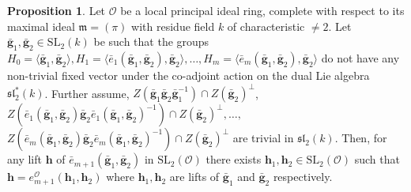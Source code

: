 \documentclass[10pt,twoside]{amsart}
\newcommand{\SL}{\mathrm{SL}}
\theoremstyle{definition}
\theoremstyle{definition}
\newtheorem{proposition}[theorem]{Proposition}
\begin{document}
\begin{proposition}{\label{adelic 2}}
Let $\mathcal{O}$ be a local principal ideal ring, complete with respect to its maximal ideal $\mathfrak{m}=(\pi)$ with residue field $k$ of characteristic $\neq 2$. Let $\mathbf{\bar g}_1, \mathbf{\bar g}_2 \in \SL_2(k)$ be such that the groups $H_0=\langle \mathbf{\bar g}_1,\mathbf{\bar g}_2\rangle, H_1=\langle \bar e_1(\mathbf{\bar g}_1,\mathbf{\bar g}_2),\mathbf{\bar g}_2\rangle, \ldots, H_m = \langle \bar e_m(\mathbf{\bar g}_1,\mathbf{\bar g}_2), \mathbf{\bar g}_2\rangle$ do not have any non-trivial fixed vector under the co-adjoint action on the dual Lie algebra $\mathfrak{sl}_2^*(k)$. Further assume, $Z\left(\mathbf{\bar g}_1\mathbf{\bar g}_2\mathbf{\bar g}_1^{-1}\right)\cap Z\left(\mathbf{\bar g}_2\right)^{\perp}$,   $Z\left(\bar e_1(\mathbf{\bar g}_1, \mathbf{\bar g}_2) \mathbf{\bar g}_2\bar e_1(\mathbf{\bar g}_1, \mathbf{\bar g}_2)^{-1}\right) \cap Z\left(\mathbf{\bar g}_2\right)^{\perp}, \ldots,$ $Z\left(\bar e_{m}(\mathbf{\bar g}_1, \mathbf{\bar g}_2)\mathbf{\bar g}_2\bar e_{m}(\mathbf{\bar g}_1, \mathbf{\bar g}_2)^{-1}\right)\cap Z\left(\mathbf{\bar g}_2\right)^{\perp}$ are trivial in $\mathfrak{sl}_2(k)$. Then, for any lift $\mathbf{h}$ of $\bar e_{m+1}(\mathbf{\bar g}_1, \mathbf{\bar g}_2)$ in $\SL_2(\mathcal O)$ there exists $\mathbf{h}_1, \mathbf{ h}_2\in\SL_2(\mathcal{O})$ such that $\mathbf{h} = e_{m+1}^{\mathcal{O}}(\mathbf{h}_1, \mathbf{h}_2)$ where $\mathbf{h}_1, \mathbf{ h}_2$ are lifts of $\mathbf{\bar g}_1$ and $\mathbf{\bar g}_2$ respectively.
\end{proposition}
\end{document}
